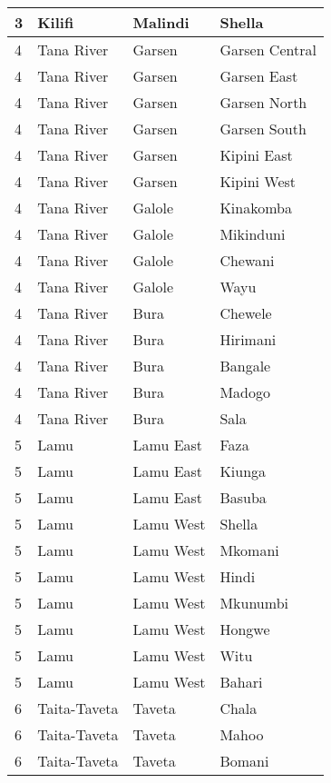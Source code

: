 \begin{table}[!ht]
\begin{tabular}{|l|l|l|l|}
        3 & Kilifi & Malindi & Shella \\ \hline
        4 & Tana River & Garsen & Garsen Central \\ \hline
        4 & Tana River & Garsen & Garsen East \\ \hline
        4 & Tana River & Garsen & Garsen North \\ \hline
        4 & Tana River & Garsen & Garsen South \\ \hline
        4 & Tana River & Garsen & Kipini East \\ \hline
        4 & Tana River & Garsen & Kipini West \\ \hline
        4 & Tana River & Galole & Kinakomba \\ \hline
        4 & Tana River & Galole & Mikinduni \\ \hline
        4 & Tana River & Galole & Chewani \\ \hline
        4 & Tana River & Galole & Wayu \\ \hline
        4 & Tana River & Bura & Chewele \\ \hline
        4 & Tana River & Bura & Hirimani \\ \hline
        4 & Tana River & Bura & Bangale \\ \hline
        4 & Tana River & Bura & Madogo \\ \hline
        4 & Tana River & Bura & Sala \\ \hline
        5 & Lamu & Lamu East & Faza \\ \hline
        5 & Lamu & Lamu East & Kiunga \\ \hline
        5 & Lamu & Lamu East & Basuba \\ \hline
        5 & Lamu & Lamu West & Shella \\ \hline
        5 & Lamu & Lamu West & Mkomani \\ \hline
        5 & Lamu & Lamu West & Hindi \\ \hline
        5 & Lamu & Lamu West & Mkunumbi \\ \hline
        5 & Lamu & Lamu West & Hongwe \\ \hline
        5 & Lamu & Lamu West & Witu \\ \hline
        5 & Lamu & Lamu West & Bahari \\ \hline
        6 & Taita-Taveta & Taveta & Chala \\ \hline
        6 & Taita-Taveta & Taveta & Mahoo \\ \hline
        6 & Taita-Taveta & Taveta & Bomani \\ \hline

\end{tabular}
\end{table}
